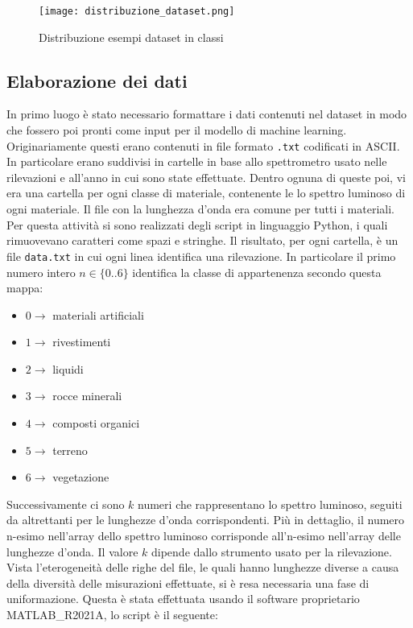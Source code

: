 \begin{figure}
    \centering
    \texttt{[image: distribuzione\_dataset.png]}
    \caption{Distribuzione esempi dataset in classi}
    \label{distr_esempi}
\end{figure}

\subsection{Elaborazione dei dati}
In primo luogo è stato necessario formattare i dati contenuti nel dataset in modo che fossero poi pronti come input per il modello di machine learning. Originariamente questi erano contenuti in file formato \verb|.txt| codificati in ASCII. In particolare erano suddivisi in cartelle in base allo spettrometro usato nelle rilevazioni e all'anno in cui sono state effettuate. Dentro ognuna di queste poi, vi era una cartella per ogni classe di materiale, contenente le lo spettro luminoso di ogni materiale. Il file con la lunghezza d'onda era comune per tutti i materiali. Per questa attività si sono realizzati degli script in linguaggio Python, i quali rimuovevano caratteri come spazi e stringhe. Il risultato, per ogni cartella, è un file \verb|data.txt| in cui ogni linea identifica una rilevazione. In particolare il primo numero intero $n \in \{ 0 .. 6 \}$ identifica la classe di appartenenza secondo questa mappa:
\begin{itemize}
    \item $0 \rightarrow$ materiali artificiali
    \item $1 \rightarrow$ rivestimenti
    \item $2 \rightarrow$ liquidi
    \item $3 \rightarrow$ rocce minerali
    \item $4 \rightarrow$ composti organici
    \item $5 \rightarrow$ terreno
    \item $6 \rightarrow$ vegetazione
\end{itemize}
Successivamente ci sono $k$ numeri che rappresentano lo spettro luminoso, seguiti da altrettanti per le lunghezze d'onda corrispondenti. Più in dettaglio, il numero n-esimo nell'array dello spettro luminoso corrisponde all'n-esimo nell'array delle lunghezze d'onda. Il valore $k$ dipende dallo strumento usato per la rilevazione.\\
Vista l'eterogeneità delle righe del file, le quali hanno lunghezze diverse a causa della diversità delle misurazioni effettuate, si è resa necessaria una fase di uniformazione. Questa è stata effettuata usando il software proprietario MATLAB\_R2021A, lo script è il seguente:


